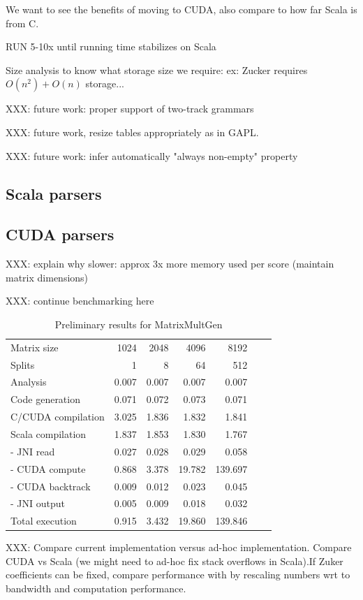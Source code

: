 {\color{red} We want to see the benefits of moving to CUDA, also compare to how far Scala is from C.}

RUN 5-10x until running time stabilizes on Scala

 {\color{red} Size analysis to know what storage size we require: ex: Zucker requires $O(n^2)+O(n)$ storage...}

XXX: future work: proper support of two-track grammars

XXX: future work, resize tables appropriately as in GAPL.

XXX: future work: infer automatically "always non-empty" property

\subsection{Scala parsers}

\subsection{CUDA parsers}
{\color{red} XXX: explain why slower: approx 3x more memory used per score (maintain matrix dimensions)

XXX: continue benchmarking here
}
\begin{table}[H]\begin{center}\begin{tabular}{lrrrrrr} \toprule
Matrix size			& 1024	& 2048	& 4096	& 8192 \\
Splits				& 1		& 8		& 64		& 512 \\ \midrule
Analysis				& 0.007	& 0.007	& 0.007	& 0.007 \\
Code generation		& 0.071	& 0.072	& 0.073	& 0.071 \\
C/CUDA compilation	& 3.025	& 1.836	& 1.832	& 1.841 \\
Scala compilation		& 1.837	& 1.853	& 1.830	& 1.767 \\ \midrule
- JNI read				& 0.027	& 0.028	& 0.029	& 0.058 \\
- CUDA compute		& 0.868	& 3.378	& 19.782	& 139.697 \\
- CUDA backtrack		& 0.009	& 0.012	& 0.023	& 0.045 \\
- JNI output			& 0.005	& 0.009	& 0.018	& 0.032 \\
Total execution			& 0.915	& 3.432	& 19.860	& 139.846 \\ \bottomrule
\end{tabular}\end{center}\caption{Preliminary results for MatrixMultGen}\end{table}

{\color{red} XXX: Compare current implementation versus ad-hoc implementation. Compare CUDA vs Scala (we might need to ad-hoc fix stack overflows in Scala).If Zuker coefficients can be fixed, compare performance with \cite{adp_gpu} by rescaling numbers wrt to bandwidth and computation performance.}

